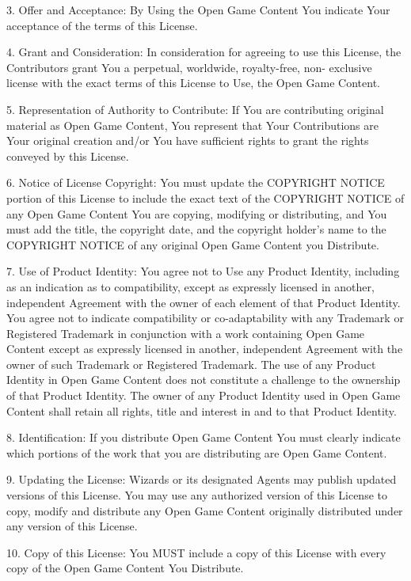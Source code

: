 \documentclass[a4paper, twocolumn, 10pt]{book}
\begin{document}
3. Offer and Acceptance: By Using the Open Game Content You indicate Your acceptance of the terms of this License.

4. Grant and Consideration: In consideration for agreeing to use this License, the Contributors grant You a perpetual, worldwide, royalty-free, non- exclusive license with the exact terms of this License to Use, the Open Game Content.

5. Representation of Authority to Contribute: If You are contributing original material as Open Game Content, You represent that Your Contributions are Your original creation and/or You have sufficient rights to grant the rights conveyed by this License.

6. Notice of License Copyright: You must update the COPYRIGHT NOTICE portion of this License to include the exact text of the COPYRIGHT NOTICE of any Open Game Content You are copying, modifying or distributing, and You must add the title, the copyright date, and the copyright holder's name to the COPYRIGHT NOTICE of any original Open Game Content you Distribute.

7. Use of Product Identity: You agree not to Use any Product Identity, including as an indication as to compatibility, except as expressly licensed in another, independent Agreement with the owner of each element of that Product Identity. You agree not to indicate compatibility or co-adaptability with any Trademark or Registered Trademark in conjunction with a work containing Open Game Content except as expressly licensed in another, independent Agreement with the owner of such Trademark or Registered Trademark. The use of any Product Identity in Open Game Content does not constitute a challenge to the ownership of that Product Identity. The owner of any Product Identity used in Open Game Content shall retain all rights, title and interest in and to that Product Identity.

8. Identification: If you distribute Open Game Content You must clearly indicate which portions of the work that you are distributing are Open Game Content.

9. Updating the License: Wizards or its designated Agents may publish updated versions of this License. You may use any authorized version of this License to copy, modify and distribute any Open Game Content originally distributed under any version of this License.

10. Copy of this License: You MUST include a copy of this License with every copy of the Open Game Content You Distribute.
\end{document}

